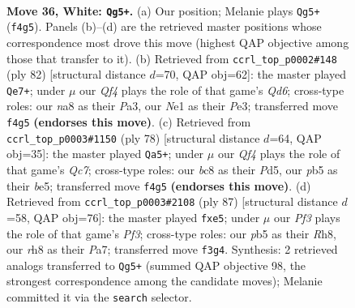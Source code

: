 \documentclass[11pt]{article}
\begin{document}
\clearpage

\begin{figure}[p]\centering
\begin{subfigure}{0.46\textwidth}\centering
\resizebox{\linewidth}{!}{%
\newchessgame
\chessboard[
  setfen={n1b4r/6k1/8/1p6/5Qpp/P2P1P2/7K/4Nq2 w - - 2 36},
  showmover=false,
  pgfstyle=straightmove, color=movearrow, markmove={f4-g5}
]}
\caption{}
\end{subfigure}\hfill
\begin{subfigure}{0.46\textwidth}\centering
\resizebox{\linewidth}{!}{%
\newchessgame
\chessboard[
  setfen={8/p7/3Q4/2p2pkp/2P5/P3P2p/5qPK/8 w - - 0 42},
  showmover=false,
  pgfstyle=straightmove, color=movearrow, markmove={d6-e7}
]}
\caption{}
\end{subfigure}
\\[4pt]
\begin{subfigure}{0.46\textwidth}\centering
\resizebox{\linewidth}{!}{%
\newchessgame
\chessboard[
  setfen={k7/2Q4p/3p4/3Pb3/2P5/1q2P3/2N4p/7K w - - 6 40},
  showmover=false,
  pgfstyle=straightmove, color=movearrow, markmove={c7-a5}
]}
\caption{}
\end{subfigure}\hfill
\begin{subfigure}{0.46\textwidth}\centering
\resizebox{\linewidth}{!}{%
\newchessgame
\chessboard[
  setfen={k6r/p7/1np1qp1P/2Q1P3/8/2R2B2/1P6/1K6 b - - 0 44},
  showmover=false,
  pgfstyle=straightmove, color=movearrow, markmove={f6-e5}
]}
\caption{}
\end{subfigure}
\caption{\textbf{Move 36, White: \texttt{Qg5+}.} (a) Our position; Melanie plays \texttt{Qg5+} (\texttt{f4g5}). Panels (b)--(d) are the retrieved master positions whose correspondence most drove this move (highest QAP objective among those that transfer to it). (b) Retrieved from \texttt{ccrl\_top\_p0002\#148} (ply 82) [structural distance $d$=70, QAP obj=62]: the master played \texttt{Qe7+}; under $\mu$ our \emph{Qf4} plays the role of that game's \emph{Qd6}; cross-type roles: our \emph{n}a8 as their \emph{P}a3, our \emph{N}e1 as their \emph{P}e3; transferred move \texttt{f4g5} \textbf{(endorses this move)}. (c) Retrieved from \texttt{ccrl\_top\_p0003\#1150} (ply 78) [structural distance $d$=64, QAP obj=35]: the master played \texttt{Qa5+}; under $\mu$ our \emph{Qf4} plays the role of that game's \emph{Qc7}; cross-type roles: our \emph{b}c8 as their \emph{P}d5, our \emph{p}b5 as their \emph{b}e5; transferred move \texttt{f4g5} \textbf{(endorses this move)}. (d) Retrieved from \texttt{ccrl\_top\_p0003\#2108} (ply 87) [structural distance $d$=58, QAP obj=76]: the master played \texttt{fxe5}; under $\mu$ our \emph{Pf3} plays the role of that game's \emph{Pf3}; cross-type roles: our \emph{p}b5 as their \emph{R}h8, our \emph{r}h8 as their \emph{P}a7; transferred move \texttt{f3g4}. Synthesis: 2 retrieved analogs transferred to \texttt{Qg5+} (summed QAP objective 98, the strongest correspondence among the candidate moves); Melanie committed it via the \texttt{search} selector.}
\label{fig:thought-m70}
\end{figure}
\end{document}
